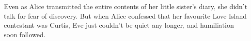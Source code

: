 \documentclass[portrait,final,archA0,fontscale=0.372]{baposter}
\begin{document}
\begin{poster}
{\vspace{0.3cm}

\noindent Even as Alice transmitted the entire contents of her little sister's diary, she didn't talk for fear of discovery. But when Alice confessed that her favourite Love Island contestant was Curtis, Eve just couldn't be quiet any longer, and humiliation soon followed.

}


\end{poster}
\end{document}
